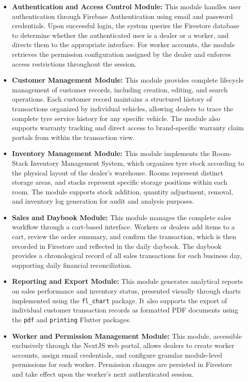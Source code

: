 \documentclass[12pt, oneside]{article}
\begin{document}
\begin{itemize}
    \item \textbf{Authentication and Access Control Module:} This module handles user authentication through Firebase Authentication using email and password credentials. Upon successful login, the system queries the Firestore database to determine whether the authenticated user is a dealer or a worker, and directs them to the appropriate interface. For worker accounts, the module retrieves the permission configuration assigned by the dealer and enforces access restrictions throughout the session.

    \item \textbf{Customer Management Module:} This module provides complete lifecycle management of customer records, including creation, editing, and search operations. Each customer record maintains a structured history of transactions organized by individual vehicles, allowing dealers to trace the complete tyre service history for any specific vehicle. The module also supports warranty tracking and direct access to brand-specific warranty claim portals from within the transaction view.

    \item \textbf{Inventory Management Module:} This module implements the Room-Stack Inventory Management System, which organizes tyre stock according to the physical layout of the dealer's warehouse. Rooms represent distinct storage areas, and stacks represent specific storage positions within each room. The module supports stock addition, quantity adjustment, removal, and inventory log generation for audit and analysis purposes.

    \item \textbf{Sales and Daybook Module:} This module manages the complete sales workflow through a cart-based interface. Workers or dealers add items to a cart, review the order summary, and confirm the transaction, which is then recorded in Firestore and reflected in the daily daybook. The daybook provides a chronological record of all sales transactions for each business day, supporting daily financial reconciliation.

    \item \textbf{Reporting and Export Module:} This module generates analytical reports on sales performance and inventory status, presented visually through charts implemented using the \texttt{fl\_chart} \cite{flchart} package. It also supports the export of individual customer transaction records as formatted PDF documents using the \texttt{pdf} \cite{pdfpkg} and \texttt{printing} Flutter packages.

    \item \textbf{Worker and Permission Management Module:} This module, accessible exclusively through the NextJS web portal, allows dealers to create worker accounts, assign email credentials, and configure granular module-level permissions for each worker. Permission changes are persisted in Firestore and take effect upon the worker's next authenticated session.
\end{itemize}
\end{document}
